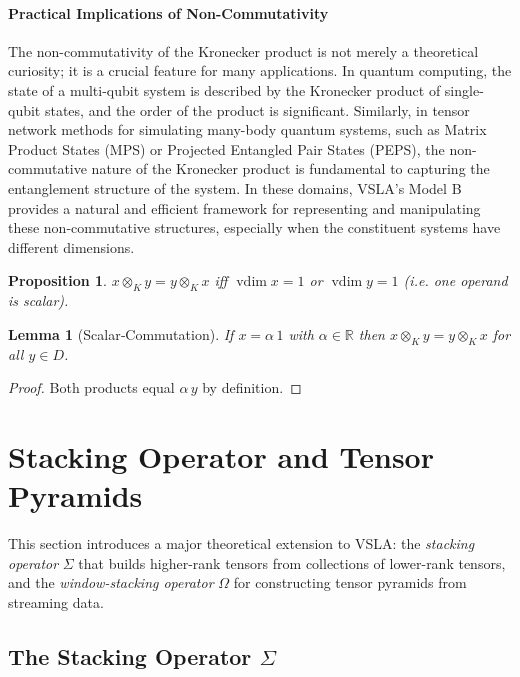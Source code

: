 \documentclass[11pt]{article}
\newtheorem{proposition}[theorem]{Proposition}
\newtheorem{lemma}[theorem]{Lemma}
\newcommand{\vdim}{\operatorname{vdim}}
\begin{document}
\paragraph{Practical Implications of Non-Commutativity}
The non-commutativity of the Kronecker product is not merely a theoretical curiosity; it is a crucial feature for many applications. In quantum computing, the state of a multi-qubit system is described by the Kronecker product of single-qubit states, and the order of the product is significant. Similarly, in tensor network methods for simulating many-body quantum systems, such as Matrix Product States (MPS) or Projected Entangled Pair States (PEPS), the non-commutative nature of the Kronecker product is fundamental to capturing the entanglement structure of the system. In these domains, VSLA's Model B provides a natural and efficient framework for representing and manipulating these non-commutative structures, especially when the constituent systems have different dimensions.

\begin{proposition}\label{prop:commCase}
$x\otimes_K y = y\otimes_K x$ iff $\vdim x =1$ or $\vdim y =1$ (i.e. one operand is scalar).
\end{proposition}

\begin{lemma}[Scalar‑Commutation]\label{lem:scalarComm}
If $x=\alpha\,1$ with $\alpha\in\mathbb R$ then $x\otimes_K y = y\otimes_K x$ for all $y\in D$.
\end{lemma}
\begin{proof}
Both products equal $\alpha\,y$ by definition.\end{proof}

\section{Stacking Operator and Tensor Pyramids}
\label{sec:stacking}

This section introduces a major theoretical extension to VSLA: the \emph{stacking operator} $\Sigma$ that builds higher-rank tensors from collections of lower-rank tensors, and the \emph{window-stacking operator} $\Omega$ for constructing tensor pyramids from streaming data.

\subsection{The Stacking Operator $\Sigma$}
\end{document}
